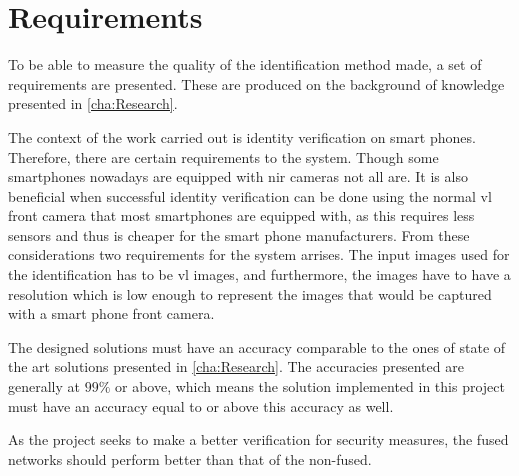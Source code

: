 \chapter{Requirements}\label{ch:req}
To be able to measure the quality of the identification method made, a set of requirements are presented. These are produced on the background of knowledge presented in \autoref{cha:Research}.

The context of the work carried out is identity verification on smart phones. Therefore, there are certain requirements to the system. Though some smartphones nowadays are equipped with \gls{nir} cameras not all are. It is also beneficial when successful identity verification can be done using the normal \gls{vl} front camera that most smartphones are equipped with, as this requires less sensors and thus is cheaper for the smart phone manufacturers. From these considerations two requirements for the system arrises. The input images used for the identification has to be \gls{vl} images, and furthermore, the images have to have a resolution which is low enough to represent the images that would be captured with a smart phone front camera.

The designed solutions must have an accuracy comparable to the ones of state of the art solutions presented in \autoref{cha:Research}. The accuracies presented are generally at $99\%$ or above, which means the solution implemented in this project must have an accuracy equal to or above this accuracy as well. 



As the project seeks to make a better verification for security measures, the fused networks should perform better than that of the non-fused.

